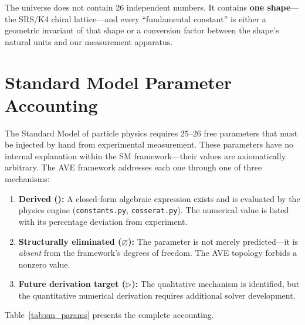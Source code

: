 \noindent
The universe does not contain 26 independent numbers.  It contains
\textbf{one shape}---the SRS/K4 chiral lattice---and every
``fundamental constant'' is either a geometric invariant of that shape
or a conversion factor between the shape's natural units and our
measurement apparatus.

\section{Standard Model Parameter Accounting}
\label{sec:sm_parameter_accounting}

The Standard Model of particle physics requires 25--26 free parameters that
must be injected by hand from experimental measurement. These parameters have
no internal explanation within the SM framework---their values are
axiomatically arbitrary. The AVE framework addresses each one through one of
three mechanisms:

\begin{enumerate}
    \item \textbf{Derived (\checkmark):} A closed-form algebraic expression
          exists and is evaluated by the physics engine
          (\texttt{constants.py}, \texttt{cosserat.py}). The numerical value
          is listed with its percentage deviation from experiment.
    \item \textbf{Structurally eliminated ($\varnothing$):} The parameter
          is not merely predicted---it is \textit{absent} from the framework's
          degrees of freedom. The AVE topology forbids a nonzero value.
    \item \textbf{Future derivation target ($\triangleright$):} The
          qualitative mechanism is identified, but the quantitative numerical
          derivation requires additional solver development.
\end{enumerate}

\noindent
Table~\ref{tab:sm_params} presents the complete accounting.

